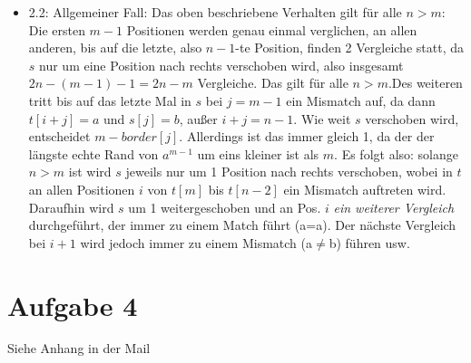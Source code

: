 \documentclass[a4paper,10pt,oneside,leqno]{scrartcl}
\begin{document}
\begin{itemize}
\begin{itemize}
  \item 2.2: Allgemeiner Fall:\newline
  Das oben beschriebene Verhalten gilt für alle $n>m$: Die ersten $m-1$ Positionen werden genau einmal verglichen, an allen anderen, bis auf
  die letzte, also $n-1$-te Position, finden 2 Vergleiche statt, da $s$ nur um eine Position nach rechts verschoben wird, also insgesamt
  $2n-(m-1)-1 = 2n-m$ Vergleiche. Das gilt für alle $n>m$.\newline Des weiteren tritt bis auf das letzte Mal in
  $s$ bei $j=m-1$ ein Mismatch auf, da dann $t[i+j] = a$ und $s[j]=b$, außer $i+j=n-1$. Wie weit $s$ verschoben wird, entscheidet
  $m-border[j]$. Allerdings ist das immer gleich 1, da der der längste echte Rand von $a^{m-1}$ um eins kleiner ist als $m$.\newline
  Es folgt also: solange $n>m$ ist wird $s$ jeweils nur um 1 Position nach rechts verschoben, wobei in $t$ an allen Positionen $i$ von $t[m]$ bis
  $t[n-2]$ ein Mismatch auftreten wird. Daraufhin wird $s$ um 1 weitergeschoben und an Pos. $i$ \textit{ein weiterer Vergleich} durchgeführt,
  der immer zu einem Match führt (a=a). Der nächste Vergleich bei $i+1$ wird jedoch immer zu einem Mismatch (a$\neq$b) führen usw.
\end{itemize}

\end{itemize}

\section*{Aufgabe 4}
Siehe Anhang in der Mail
\end{document}
